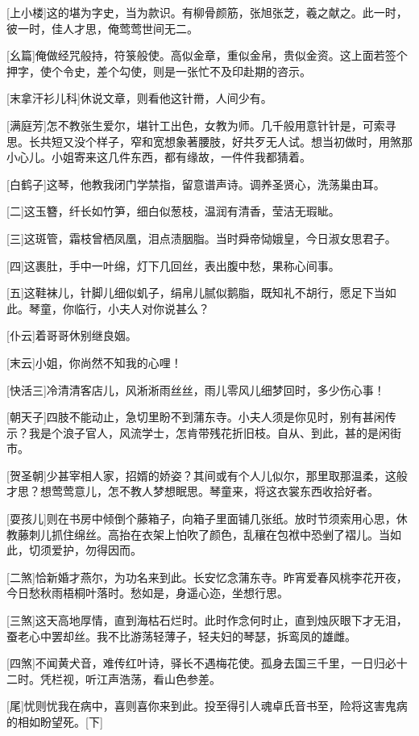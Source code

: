 \documentclass{book}
\begin{document}
[上小楼]这的堪为字史，当为款识。有柳骨颜筋，张旭张芝，羲之献之。此一时，彼一时，佳人才思，俺莺莺世间无二。

[幺篇]俺做经咒般持，符箓般使。高似金章，重似金帛，贵似金资。这上面若签个押字，使个令史，差个勾使，则是一张忙不及印赴期的咨示。

[末拿汗衫儿科]休说文章，则看他这针黹，人间少有。

[满庭芳]怎不教张生爱尔，堪针工出色，女教为师。几千般用意针针是，可索寻思。长共短又没个样子，窄和宽想象著腰肢，好共歹无人试。想当初做时，用煞那小心儿。小姐寄来这几件东西，都有缘故，一件件我都猜着。

[白鹤子]这琴，他教我闭门学禁指，留意谱声诗。调养圣贤心，洗荡巢由耳。

[二]这玉簪，纤长如竹笋，细白似葱枝，温润有清香，莹洁无瑕眦。

[三]这斑管，霜枝曾栖凤凰，泪点渍胭脂。当时舜帝恸娥皇，今日淑女思君子。

[四]这裹肚，手中一叶绵，灯下几回丝，表出腹中愁，果称心间事。

[五]这鞋袜儿，针脚儿细似虮子，绢帛儿腻似鹅脂，既知礼不胡行，愿足下当如此。琴童，你临行，小夫人对你说甚么？

[仆云]着哥哥休别继良姻。

[末云]小姐，你尚然不知我的心哩！

[快活三]冷清清客店儿，风淅淅雨丝丝，雨儿零风儿细梦回时，多少伤心事！

[朝天子]四肢不能动止，急切里盼不到蒲东寺。小夫人须是你见时，别有甚闲传示？我是个浪子官人，风流学士，怎肯带残花折旧枝。自从、到此，甚的是闲街市。

[贺圣朝]少甚宰相人家，招婿的娇姿？其间或有个人儿似尔，那里取那温柔，这般才思？想莺莺意儿，怎不教人梦想眠思。琴童来，将这衣裳东西收拾好者。

[耍孩儿]则在书房中倾倒个藤箱子，向箱子里面铺几张纸。放时节须索用心思，休教藤刺儿抓住绵丝。高抬在衣架上怕吹了颜色，乱穰在包袱中恐剉了褶儿。当如此，切须爱护，勿得因而。

[二煞]恰新婚才燕尔，为功名来到此。长安忆念蒲东寺。昨宵爱春风桃李花开夜，今日愁秋雨梧桐叶落时。愁如是，身遥心迩，坐想行思。

[三煞]这天高地厚情，直到海枯石烂时。此时作念何时止，直到烛灰眼下才无泪，蚕老心中罢却丝。我不比游荡轻薄子，轻夫妇的琴瑟，拆鸾凤的雄雌。

[四煞]不闻黄犬音，难传红叶诗，驿长不遇梅花使。孤身去国三千里，一日归必十二时。凭栏视，听江声浩荡，看山色参差。

[尾]忧则忧我在病中，喜则喜你来到此。投至得引人魂卓氏音书至，险将这害鬼病的相如盼望死。[下]
\end{document}
